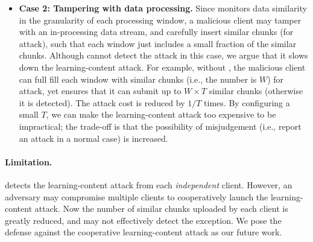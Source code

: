 \begin{itemize}[leftmargin=*]

\item {\bf Case 2: Tampering with data processing.}
  Since \sysnameF monitors data similarity in the granularity of each processing window, a malicious client may tamper with an in-processing data stream, and carefully insert similar chunks (for attack), such that each window just includes a small fraction of  the similar chunks.  Although \sysnameF cannot detect the attack in this case, we argue that it slows down the learning-content attack. For example, without \sysnameF, the malicious client can full fill each window with similar chunks (i.e., the number is $W$) for attack, yet \sysnameF ensures that it can submit up to $W \times T$ similar chunks (otherwise it is detected). The attack cost is reduced by $1 / T$ times. By configuring a small $T$, we can make the learning-content attack too expensive to be impractical; the trade-off is that the possibility of misjudgement (i.e., report an attack in a normal case) is increased.


\end{itemize}



\paragraph{Limitation.}
\sysnameF detects the learning-content attack from each {\em independent} client. However, an adversary may compromise multiple clients to cooperatively launch the learning-content attack. Now the number of similar chunks uploaded by each client is greatly reduced, and \sysnameF may not effectively detect the exception. We pose the defense against the cooperative learning-content attack as our future work.


